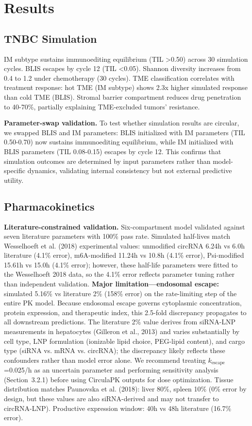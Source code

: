 \documentclass[12pt]{article}
\begin{document}
\section{Results}

\subsection{TNBC Simulation}

IM subtype sustains immunoediting equilibrium (TIL >0.50) across 30 simulation cycles. BLIS escapes by cycle 12 (TIL <0.05). Shannon diversity increases from 0.4 to 1.2 under chemotherapy (30 cycles). TME classification correlates with treatment response: hot TME (IM subtype) shows 2.3x higher simulated response than cold TME (BLIS). Stromal barrier compartment reduces drug penetration to 40-70\%, partially explaining TME-excluded tumors' resistance.

\textbf{Parameter-swap validation.} To test whether simulation results are circular, we swapped BLIS and IM parameters: BLIS initialized with IM parameters (TIL 0.50-0.70) now sustains immunoediting equilibrium, while IM initialized with BLIS parameters (TIL 0.08-0.15) escapes by cycle 12. This confirms that simulation outcomes are determined by input parameters rather than model-specific dynamics, validating internal consistency but not external predictive utility.

\subsection{Pharmacokinetics}

\textbf{Literature-constrained validation.} Six-compartment model validated against seven literature parameters with 100\% pass rate. Simulated half-lives match Wesselhoeft et al. (2018) experimental values: unmodified circRNA 6.24h vs 6.0h literature (4.1\% error), m6A-modified 11.24h vs 10.8h (4.1\% error), Psi-modified 15.61h vs 15.0h (4.1\% error); however, these half-life parameters were fitted to the Wesselhoeft 2018 data, so the 4.1\% error reflects parameter tuning rather than independent validation. \textbf{Major limitation—endosomal escape:} simulated 5.16\% vs literature 2\% (158\% error) on the rate-limiting step of the entire PK model. Because endosomal escape governs cytoplasmic concentration, protein expression, and therapeutic index, this 2.5-fold discrepancy propagates to all downstream predictions. The literature 2\% value derives from siRNA-LNP measurements in hepatocytes (Gilleron et al., 2013) and varies substantially by cell type, LNP formulation (ionizable lipid choice, PEG-lipid content), and cargo type (siRNA vs. mRNA vs. circRNA); the discrepancy likely reflects these confounders rather than model error alone. We recommend treating $k_{\text{escape}}$=0.025/h as an uncertain parameter and performing sensitivity analysis (Section~3.2.1) before using CirculaPK outputs for dose optimization. Tissue distribution matches Paunovska et al. (2018): liver 80\%, spleen 10\% (0\% error by design, but these values are also siRNA-derived and may not transfer to circRNA-LNP). Productive expression window: 40h vs 48h literature (16.7\% error).
\end{document}
